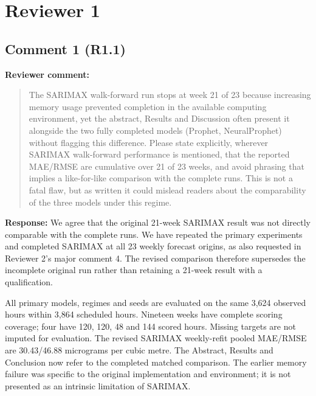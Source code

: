 \documentclass[11pt,a4paper]{article}
\begin{document}
\section*{Reviewer 1}
\begin{samepage}
\subsection*{Comment 1 (R1.1)}
\textbf{Reviewer comment:}
\begin{quote}\small The SARIMAX walk-forward run stops at week 21 of 23 because increasing memory usage prevented completion in the available computing environment, yet the abstract, Results and Discussion often present it alongside the two fully completed models (Prophet, NeuralProphet) without flagging this difference. Please state explicitly, wherever SARIMAX walk-forward performance is mentioned, that the reported MAE/RMSE are cumulative over 21 of 23 weeks, and avoid phrasing that implies a like-for-like comparison with the complete runs. This is not a fatal flaw, but as written it could mislead readers about the comparability of the three models under this regime.\end{quote}
\end{samepage}
\textbf{Response:}
We agree that the original 21-week SARIMAX result was not directly comparable with the complete runs. We have repeated the primary experiments and completed SARIMAX at all 23 weekly forecast origins, as also requested in Reviewer 2's major comment 4. The revised comparison therefore supersedes the incomplete original run rather than retaining a 21-week result with a qualification.

All primary models, regimes and seeds are evaluated on the same 3,624 observed hours within 3,864 scheduled hours. Nineteen weeks have complete scoring coverage; four have 120, 120, 48 and 144 scored hours. Missing targets are not imputed for evaluation. The revised SARIMAX weekly-refit pooled MAE/RMSE are 30.43/46.88 micrograms per cubic metre. The Abstract, Results and Conclusion now refer to the completed matched comparison. The earlier memory failure was specific to the original implementation and environment; it is not presented as an intrinsic limitation of SARIMAX.
\end{document}
